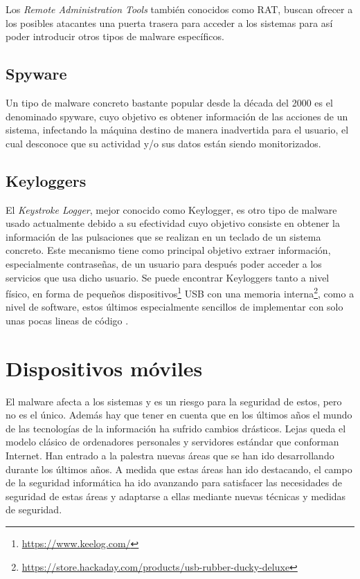 Los \textit{Remote Administration Tools} también conocidos como RAT, buscan ofrecer a los posibles atacantes una puerta trasera para acceder a los sistemas para así poder introducir otros tipos de malware específicos.

\subsection{Spyware}

Un tipo de malware concreto bastante popular desde la década del 2000 es el denominado spyware, cuyo objetivo es obtener información de las acciones de un sistema, infectando la máquina destino de manera inadvertida para el usuario, el cual desconoce que su actividad y/o sus datos están siendo monitorizados.

\subsection{Keyloggers}

El \textit{Keystroke Logger}, mejor conocido como Keylogger, es otro tipo de malware usado actualmente debido a su efectividad cuyo objetivo consiste en obtener la información de las pulsaciones que se realizan en un teclado de un sistema concreto. Este mecanismo tiene como principal objetivo extraer información, especialmente contraseñas, de un usuario para después poder acceder a los servicios que usa dicho usuario. Se puede encontrar Keyloggers tanto a nivel físico, en forma de pequeños dispositivos\footnote{\url{https://www.keelog.com/}} USB con una memoria interna\footnote{\url{https://store.hackaday.com/products/usb-rubber-ducky-deluxe}}, como a nivel de software, estos últimos especialmente sencillos de implementar con solo unas pocas lineas de código \cite{ander-keylogger}.


\section{Dispositivos móviles}

El malware afecta a los sistemas y es un riesgo para la seguridad de estos, pero no es el único. Además hay que tener en cuenta que en los últimos años el mundo de las tecnologías de la información ha sufrido cambios drásticos. Lejas queda el modelo clásico de ordenadores personales y servidores estándar que conforman Internet. Han entrado a la palestra nuevas áreas que se han ido desarrollando durante los últimos años. A medida que estas áreas han ido destacando, el campo de la seguridad informática ha ido avanzando para satisfacer las necesidades de seguridad de estas áreas y adaptarse a ellas mediante nuevas técnicas y medidas de seguridad.

